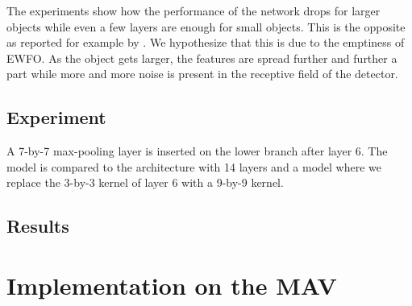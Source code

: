 	The experiments show how the performance of the network drops for larger objects while even a few layers are enough for small objects. This is the opposite as reported for example by . We hypothesize that this is due to the emptiness of \ac{EWFO}. As the object gets larger, the features are spread further and further a part while more and more noise is present in the receptive field of the detector.
	
	\subsection{Experiment}
	
	 A 7-by-7 max-pooling layer is inserted on the lower branch after layer 6. The model is compared to the architecture with 14 layers and a model where we replace the 3-by-3 kernel of layer 6 with a 9-by-9 kernel.
	 
	 \subsection{Results}
	 
	
	\section{Implementation on the \ac{MAV}}